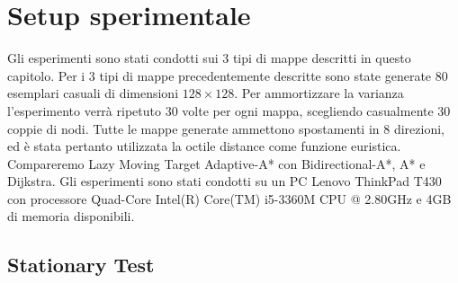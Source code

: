 \documentclass[11pt]{book}
\begin{document}
{\begin{algorithm}

  
\end{algorithm}

\section{Setup sperimentale}
\par{Gli esperimenti sono stati condotti sui 3 tipi di mappe descritti in questo capitolo. Per i 3 tipi di mappe precedentemente descritte sono state generate 80 esemplari casuali di dimensioni $128 \times 128$. Per ammortizzare la varianza l'esperimento verr\`a ripetuto 30 volte per ogni mappa, scegliendo casualmente 30 coppie di nodi. Tutte le mappe generate ammettono spostamenti in 8 direzioni, ed \`e stata pertanto utilizzata la octile distance come funzione euristica. Compareremo Lazy Moving Target Adaptive-A* con Bidirectional-A*, A* e Dijkstra. Gli esperimenti sono stati condotti su un PC Lenovo ThinkPad T430 con processore Quad-Core Intel(R) Core(TM) i5-3360M CPU @ 2.80GHz e 4GB di memoria disponibili.
  }
\iffalse
\subsection{Stationary Test}

}
\end{document}
